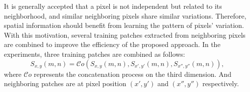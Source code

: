\documentclass[journal]{IEEEtran}
\begin{document}
It is generally accepted that a pixel is not independent but related to its neighborhood,
and similar neighboring pixels share similar variations.
%
Therefore,
spatial information should benefit from learning the pattern of pixels' variation.
%
With this motivation,
several training patches extracted from neighboring pixels are combined to improve the efficiency of the proposed approach.
%
In the experiments, three training patches are combined as follows:
\begin{equation}
    S_{x,y}(m,n) = \mathcal{C}o(S_{x,y}(m,n), S_{x', y'}(m,n), S_{x'', y ''}(m, n)),
\end{equation}
where $\mathcal{C}o$ represents the concatenation process on the third dimension.
And neighboring patches are at pixel position $(x',y')$ and $(x'',y'')$ respectively.
% 
% 
\end{document}
